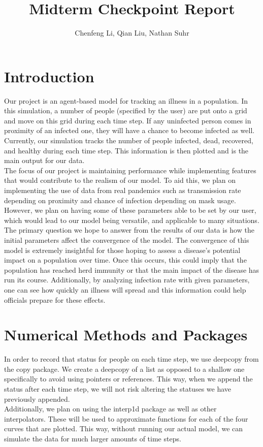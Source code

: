 \documentclass{article}
\title{Midterm Checkpoint Report}
\author{Chenfeng Li, Qian Liu, Nathan Suhr}
\begin{document}
\maketitle

\section{Introduction}

Our project is an agent-based model for tracking an illness in a population. In this simulation, a number of people (specified by the user) are put onto a grid and move on this grid during each time step. If any uninfected person comes in proximity of an infected one, they will have a chance to become infected as well. Currently, our simulation tracks the number of people infected, dead, recovered, and healthy during each time step. This information is then plotted and is the main output for our data. \\The focus of our project is maintaining performance while implementing features that would contribute to the realism of our model. To aid this, we plan on implementing the use of data from real pandemics such as transmission rate depending on proximity and chance of infection depending on mask usage. However, we plan on having some of these parameters able to be set by our user, which would lead to our model being versatile, and applicable to many situations. \\The primary question we hope to answer from the results of our data is how the initial parameters affect the convergence of the model. The convergence of this model is extremely insightful for those hoping to assess a disease's potential impact on a population over time. Once this occurs, this could imply that the population has reached herd immunity or that the main impact of the disease has run its course. Additionally, by analyzing infection rate with given parameters, one can see how quickly an illness will spread and this information could help officials prepare for these effects.

\section{Numerical Methods and Packages}

In order to record that status for people on each time step, we use deepcopy from the copy package. We create a deepcopy of a list as opposed to a shallow one specifically to avoid using pointers or references. This way, when we append the status after each time step, we will not risk altering the statuses we have previously appended. \\Additionally, we plan on using the interp1d package as well as other interpolators. These will be used to approximate functions for each of the four curves that are plotted. This way, without running our actual model, we can simulate the data for much larger amounts of time steps. 
\end{document}
